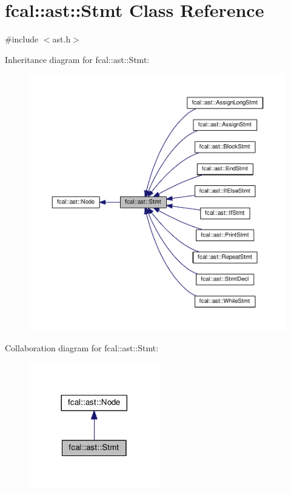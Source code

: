 \hypertarget{classfcal_1_1ast_1_1Stmt}{}\section{fcal\+:\+:ast\+:\+:Stmt Class Reference}
\label{classfcal_1_1ast_1_1Stmt}


{\ttfamily \#include $<$ast.\+h$>$}



Inheritance diagram for fcal\+:\+:ast\+:\+:Stmt\+:\nopagebreak
\begin{figure}[H]
\begin{center}
\leavevmode
\includegraphics[width=350pt]{classfcal_1_1ast_1_1Stmt__inherit__graph}
\end{center}
\end{figure}


Collaboration diagram for fcal\+:\+:ast\+:\+:Stmt\+:\nopagebreak
\begin{figure}[H]
\begin{center}
\leavevmode
\includegraphics[width=161pt]{classfcal_1_1ast_1_1Stmt__coll__graph}
\end{center}
\end{figure}
